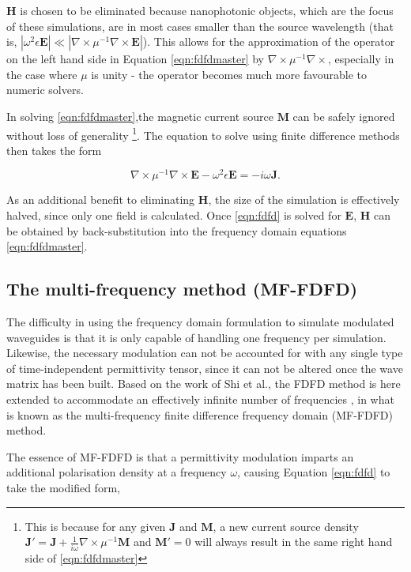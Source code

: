 $\bm{H}$ is chosen to be eliminated because nanophotonic objects, which are the focus of these simulations, are in most cases smaller than the source wavelength (that is, $|\omega^2 \epsilon \bm{E}| \ll |\nabla \times \mu^{-1} \nabla \times \bm{E}|$). This allows for the approximation of the operator on the left hand side in Equation \ref{eqn:fdfdmaster} by $\nabla \times \mu^{-1} \nabla \times$, especially in the case where $\mu$ is unity - the operator becomes much more favourable to numeric solvers.

In solving \ref{eqn:fdfdmaster},the magnetic current source $\bm{M}$ can be safely ignored without loss of generality \footnote{This is because for any given $\bm{J}$ and $\bm{M}$, a new current source density $\bm{J'} = \bm{J} + \frac{1}{i \omega} \nabla \times \mu^{-1} \bm{M}$ and $\bm{M'}=0$ will always result in the same right hand side of \ref{eqn:fdfdmaster}}. The equation to solve using finite difference methods then takes the form 

\begin{equation}
\nabla \times \mu^{-1} \nabla \times \bm{E} - \omega^2 \epsilon \bm{E} = -i \omega \bm{J}.
\label{eqn:fdfd}
\end{equation}

As an additional benefit to eliminating $\bm{H}$, the size of the simulation is effectively halved, since only one field is calculated. Once \ref{eqn:fdfd} is solved for $\bm{E}$, $\bm{H}$ can be obtained by back-substitution into the frequency domain equations \ref{eqn:fdfdmaster}.

\subsection{The multi-frequency method (MF-FDFD)}

The difficulty in using the frequency domain formulation to simulate modulated waveguides is that it is only capable of handling one frequency per simulation. Likewise, the necessary modulation can not be accounted for with any single type of time-independent permittivity tensor, since it can not be altered once the wave matrix has been built. Based on the work of Shi et al., the FDFD method is here extended to accommodate an effectively infinite number of frequencies \cite{Shi2016}, in what is known as the multi-frequency finite difference frequency domain (MF-FDFD) method.

The essence of MF-FDFD is that a permittivity modulation imparts an additional polarisation density at a frequency $\omega$, causing Equation \ref{eqn:fdfd} to take the modified form,

